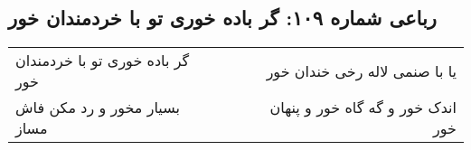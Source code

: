 \begin{center}
\section*{رباعی شماره ۱۰۹: گر باده خوری تو با خردمندان خور}
\label{sec:sh109}
\begin{longtable}{l p{0.5cm} r}
گر باده خوری تو با خردمندان خور
&&
یا با صنمی لاله رخی خندان خور
\\
بسیار مخور و رد مکن فاش مساز
&&
اندک خور و گه گاه خور و پنهان خور
\\
\end{longtable}
\end{center}
